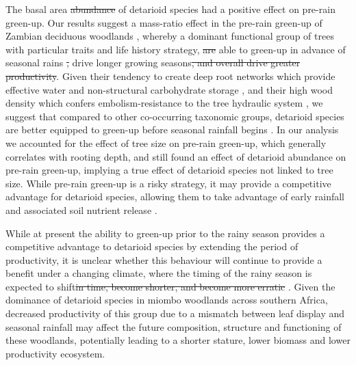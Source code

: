 \documentclass[11pt,a4paper]{article}
\providecommand{\DIFaddtex}[1]{{\protect\color{blue}\uwave{#1}}} %
\providecommand{\DIFdeltex}[1]{{\protect\color{red}\sout{#1}}}                      %
\providecommand{\DIFaddbegin}{} %
\providecommand{\DIFaddend}{} %
\providecommand{\DIFdelbegin}{} %
\providecommand{\DIFdelend}{} %
\providecommand{\DIFadd}[1]{\texorpdfstring{\DIFaddtex{#1}}{#1}} %
\providecommand{\DIFdel}[1]{\texorpdfstring{\DIFdeltex{#1}}{}} %
\newcommand{\DIFscaledelfig}{0.5}
\newlength{\DIFdelgraphicswidth} %
\newlength{\DIFdelgraphicsheight} %
\newcommand{\DIFaddincludegraphics}[2][]{{\color{blue}\fbox{\DIFOincludegraphics[#1]{#2}}}} %
\newcommand{\DIFdelincludegraphics}[2][]{%
\sbox{\DIFdelgraphicsbox}{\DIFOincludegraphics[#1]{#2}}%
\settoboxwidth{\DIFdelgraphicswidth}{\DIFdelgraphicsbox} %
\settoboxtotalheight{\DIFdelgraphicsheight}{\DIFdelgraphicsbox} %
\scalebox{\DIFscaledelfig}{%
\parbox[b]{\DIFdelgraphicswidth}{\usebox{\DIFdelgraphicsbox}\\[-\baselineskip] \rule{\DIFdelgraphicswidth}{0em}}\llap{\resizebox{\DIFdelgraphicswidth}{\DIFdelgraphicsheight}{%
\setlength{\unitlength}{\DIFdelgraphicswidth}%
\begin{picture}(1,1)%
\thicklines\linethickness{2pt} %
{\color[rgb]{1,0,0}\put(0,0){\framebox(1,1){}}}%
{\color[rgb]{1,0,0}\put(0,0){\line( 1,1){1}}}%
{\color[rgb]{1,0,0}\put(0,1){\line(1,-1){1}}}%
\end{picture}%
}\hspace*{3pt}}} %
} %
\DeclareRobustCommand{\DIFaddbegin}{\DIFOaddbegin \let\includegraphics\DIFaddincludegraphics} %
\DeclareRobustCommand{\DIFaddend}{\DIFOaddend \let\includegraphics\DIFOincludegraphics} %
\DeclareRobustCommand{\DIFdelbegin}{\DIFOdelbegin \let\includegraphics\DIFdelincludegraphics} %
\DeclareRobustCommand{\DIFdelend}{\DIFOaddend \let\includegraphics\DIFOincludegraphics} %
\begin{document}
The basal area \DIFdelbegin \DIFdel{abundance }\DIFdelend of detarioid species had a positive effect on pre-rain green-up.
Our results suggest a mass-ratio effect in the pre-rain green-up of Zambian
deciduous woodlands \citep{Grime1998}, whereby a dominant functional group of
trees with particular traits and life history strategy, \DIFdelbegin \DIFdel{are }\DIFdelend \DIFaddbegin \DIFadd{is }\DIFaddend able to green-up in
advance of seasonal rains \DIFdelbegin \DIFdel{, }\DIFdelend \DIFaddbegin \DIFadd{and }\DIFaddend drive longer growing seasons\DIFdelbegin \DIFdel{, and
overall drive greater productivity}\DIFdelend . Given their
tendency to create deep root networks which provide effective water and
non-structural carbohydrate storage \citep{Zhou2020, Timberlake1993}, and their
high wood density which confers embolism-resistance to the tree hydraulic
system \citep{Hoffmann2011, Hacke2001, Chave2009}, we suggest that compared to
other co-occurring taxonomic groups, detarioid species are better equipped to
green-up before seasonal rainfall begins \citep{Vinya2018}. In our analysis we
accounted for the effect of tree size on pre-rain green-up, which generally
correlates with rooting depth, and still found an effect of detarioid abundance
on pre-rain green-up, implying a true effect of detarioid species not linked to
tree size. While pre-rain green-up is a risky strategy, it may provide a
competitive advantage for detarioid species, allowing them to take advantage of
early rainfall and associated soil nutrient release \citep{February2016}.

While at present the ability to green-up prior to the rainy season provides a
competitive advantage to detarioid species by extending the period of
productivity, it is unclear whether this behaviour will continue to provide a
benefit under a changing climate, where the timing of the rainy season is
expected to shift\DIFdelbegin \DIFdel{in time, become shorter, and become more erratic }\DIFdelend \DIFaddbegin \DIFadd{, becoming more erratic and shorter overall
}\DIFaddend \citep{Shongwe2011, Pohl2017, Wainwright2021}. Given the dominance of detarioid
species in miombo woodlands across southern Africa, decreased productivity of
this group due to a mismatch between leaf display and seasonal rainfall may
affect the future composition, structure and functioning of these woodlands,
potentially leading to a shorter stature, lower biomass and lower productivity
ecosystem.
\end{document}
